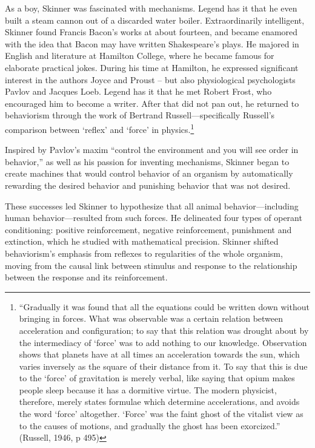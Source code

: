 As a boy, Skinner was fascinated with mechanisms. Legend has it that he even built a steam cannon out of a discarded water boiler. Extraordinarily intelligent, Skinner found Francis Bacon's works at about fourteen, and became enamored with the idea that Bacon may have written Shakespeare's plays. He majored in English and literature at Hamilton College, where he became famous for elaborate practical jokes. During his time at Hamilton, he expressed significant interest in the authors Joyce and Proust – but also physiological psychologists Pavlov and Jacques Loeb. Legend has it that he met Robert Frost, who encouraged him to become a writer. After that did not pan out, he returned to behaviorism through the work of Bertrand Russell---specifically Russell's comparison between `reflex' and `force' in physics.\footnote{“Gradually it was found that all the equations could be written down without bringing in forces. What was observable was a certain relation between acceleration and configuration; to say that this relation was drought about by the intermediacy of `force' was to add nothing to our knowledge. Observation shows that planets have at all times an acceleration towards the sun, which varies inversely as the square of their distance from it. To say that this is due to the `force' of gravitation is merely verbal, like saying that opium makes people sleep because it has a dormitive virtue. The modern physicist, therefore, merely states formulae which determine accelerations, and avoids the word `force' altogether. `Force' was the faint ghost of the vitalist view as to the causes of motions, and gradually the ghost has been exorcized.” (Russell, 1946, p 495)}

Inspired by Pavlov's maxim “control the environment and you will see order in behavior,” as well as his passion for inventing mechanisms, Skinner began to create machines that would control behavior of an organism by automatically rewarding the desired behavior and punishing behavior that was not desired.

These successes led Skinner to hypothesize that all animal behavior---including human behavior---resulted from such forces. He delineated four types of operant conditioning: positive reinforcement, negative reinforcement, punishment and extinction, which he studied with mathematical precision. Skinner shifted behaviorism's emphasis from reflexes to regularities of the whole organism, moving from the causal link between stimulus and response to the relationship between the response and its reinforcement.

